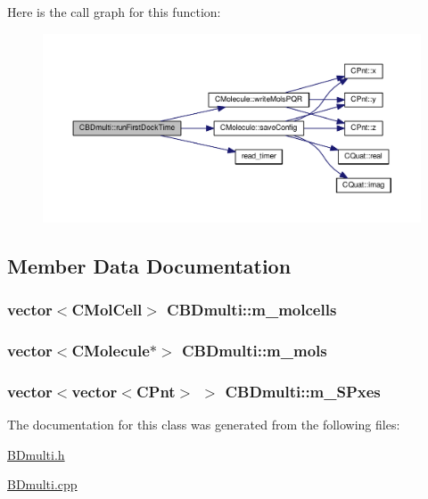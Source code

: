 Here is the call graph for this function\-:\nopagebreak
\begin{figure}[H]
\begin{center}
\leavevmode
\includegraphics[width=350pt]{classCBDmulti_a62bd0bcd8a4e060e63093d318f0b39c1_cgraph}
\end{center}
\end{figure}




\subsection{Member Data Documentation}
\hypertarget{classCBDmulti_a477fcf39d8a1fe28e14dbc1580b4a250}{
\subsubsection[{m\-\_\-molcells}]{\setlength{\rightskip}{0pt plus 5cm}vector$<${\bf C\-Mol\-Cell}$>$ C\-B\-Dmulti\-::m\-\_\-molcells}}\label{classCBDmulti_a477fcf39d8a1fe28e14dbc1580b4a250}
\hypertarget{classCBDmulti_a1648f5007c6c0e3458e11e65f266bc9e}{
\subsubsection[{m\-\_\-mols}]{\setlength{\rightskip}{0pt plus 5cm}vector$<${\bf C\-Molecule}$\ast$$>$ C\-B\-Dmulti\-::m\-\_\-mols}}\label{classCBDmulti_a1648f5007c6c0e3458e11e65f266bc9e}
\hypertarget{classCBDmulti_a59241b29096bb88713aba753b0e0142c}{
\subsubsection[{m\-\_\-\-S\-Pxes}]{\setlength{\rightskip}{0pt plus 5cm}vector$<$vector$<${\bf C\-Pnt}$>$ $>$ C\-B\-Dmulti\-::m\-\_\-\-S\-Pxes}}\label{classCBDmulti_a59241b29096bb88713aba753b0e0142c}


The documentation for this class was generated from the following files\-:\begin{DoxyCompactItemize}
\item 
\hyperlink{BDmulti_8h}{B\-Dmulti.\-h}\item 
\hyperlink{BDmulti_8cpp}{B\-Dmulti.\-cpp}\end{DoxyCompactItemize}
